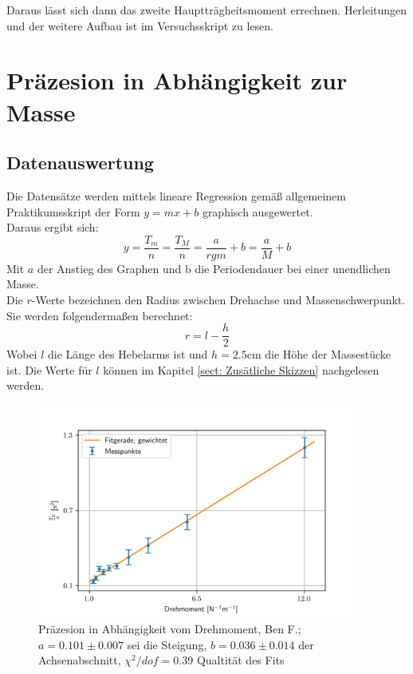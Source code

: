 \documentclass[bibliography=totocnumbered]{scrartcl}
\begin{document}
	Daraus lässt sich dann das zweite Hauptträgheitsmoment errechnen.
	Herleitungen und der weitere Aufbau ist im Versuchsskript\smartcite{Muller.d} zu lesen.
	\newpage
	
	
	\section{Präzesion in Abhängigkeit zur Masse}
	
	\subsection{Datenauswertung}\label{sect: Datenauswertung A1}
	Die Datensätze werden mittels lineare Regression gemäß allgemeinem Praktikumsskript\smartcite{MullerPG.2007b} der Form $ y=mx+b $ graphisch ausgewertet.\\
	Daraus ergibt sich:
	\begin{equation}\label{eq: Prezäsion Drehmoment}
		y=\dfrac{T_{m}}{n}=\dfrac{T_{M}}{n}=\dfrac{a}{rg m}+b=\dfrac{a}{M}+b
	\end{equation}
Mit $ a $ der Anstieg des Graphen und b die Periodendauer bei einer unendlichen Masse.\\
	Die $ r $-Werte bezeichnen den Radius zwischen Drehachse und Massenschwerpunkt. Sie werden folgendermaßen berechnet:
	\begin{equation}\label{eq: Hebelarm radius}
		r= l-\dfrac{h}{2}
	\end{equation}  
	Wobei $ l $ die Länge des Hebelarms ist und $ h=2.5 $cm die Höhe der Massestücke ist. Die Werte für $ l $ können im Kapitel \ref{sect: Zusätliche Skizzen} nachgelesen werden.
	
		\begin{figure}[!ht]
		\centering								 
		\includegraphics[width=300pt]{fotos/gpr1/A1.png}
		\caption[Präzesion in Abhängigkeit vom Drehmoment]{Präzesion in Abhängigkeit vom Drehmoment, Ben F.; $ a=0.101\pm 0.007 $ sei die Steigung, $ b=0.036\pm 0.014 $ der Achsenabschnitt, $ \chi^{2}/dof=0.39 $ Qualtität des Fits}							 
		\label{Abb: A1 Ben}							 
	\end{figure}
\end{document}
